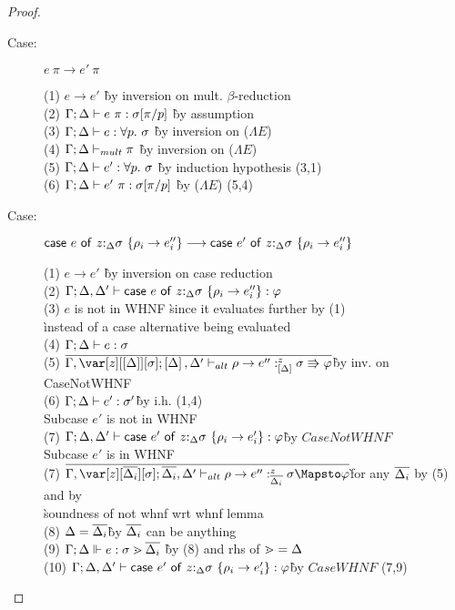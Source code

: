 \begin{proof}
\begin{description}
\item[Case:] $e~\pi \longrightarrow e'~\pi$
\begin{tabbing}
(1) $e \longrightarrow e'$ \` by inversion on mult. $\beta$-reduction \\
(2) $\Gamma; \Delta \vdash e~\pi : \sigma[\pi/p]$ \` by assumption \\
(3) $\Gamma; \Delta \vdash e : \forall p.~\sigma$ \` by inversion on ($\Lambda E$) \\
(4) $\Gamma; \Delta \vdash_{mult} \pi$ \` by inversion on ($\Lambda E$) \\
(5) $\Gamma; \Delta \vdash e' : \forall p.~\sigma$ \` by induction hypothesis (3,1) \\
(6) $\Gamma; \Delta \vdash e'~\pi : \sigma[\pi/p]$ \` by ($\Lambda E$) (5,4) \\
\end{tabbing}

\item[Case:] $\mathsf{case}~e~\mathsf{of}~z{:}_{\Delta}\sigma~\{\rho_i\to e''_i\} \longrightarrow \mathsf{case}~e'~\mathsf{of}~z{:}_{\Delta}\sigma~\{\rho_i\to e''_i\}$
\begin{tabbing}
    (1) $e \longrightarrow e'$ \` by inversion on case reduction \\
    (2) $\Gamma; \Delta, \Delta' \vdash \mathsf{case}~e~\mathsf{of}~z{:}_{\Delta}\sigma~\{\rho_i\to e''_i\} : \varphi$\\
    (3) $e$ is not in WHNF \` since it evaluates further by (1)\\ \` instead of a case alternative being evaluated\\
    (4) $\Gamma;\Delta \vdash e : \sigma$\\
    (5) $\ov{\G,\z[\irr{\D}][\s]; \irr{\D},\D' \vdash_{alt} \rho \to e'' :^z_{\irr{\D}} \s \Rrightarrow \vp}$\` by inv. on CaseNotWHNF\\
    (6) $\Gamma;\Delta \vdash e' : \sigma'$\` by i.h. (1,4)\\
    Subcase $e'$ is not in WHNF\\
    (7) $\Gamma; \Delta, \Delta' \vdash \mathsf{case}~e'~\mathsf{of}~z{:}_{\Delta}\sigma~\{\rho_i\to e'_i\} : \varphi$\` by $CaseNotWHNF$\\
    Subcase $e'$ is in WHNF\\
    (7) $\ov{\G,\z[\ov{\D_i}][\s]; \ov{\D_i},\D' \vdash_{alt} \rho \to e'' :^z_{\ov{\D_i}} \s \Mapsto \vp}$\` for any $\overline{\Delta_i}$ by (5) and by \\\` soundness of not whnf wrt whnf lemma\\
    (8) $\Delta = \overline{\Delta_i}$\` by $\overline{\Delta_i}$ can be anything\\
    (9) $\Gamma; \Delta \Vdash e : \sigma \gtrdot \overline{\Delta_i}$ \`by (8) and rhs of $\gtrdot = \Delta$\\
    (10) $\Gamma; \Delta, \Delta' \vdash \mathsf{case}~e'~\mathsf{of}~z{:}_{\Delta}\sigma~\{\rho_i\to e'_i\} : \varphi$\` by $CaseWHNF$ (7,9)\\
\end{tabbing}

\end{description}

\end{proof}

